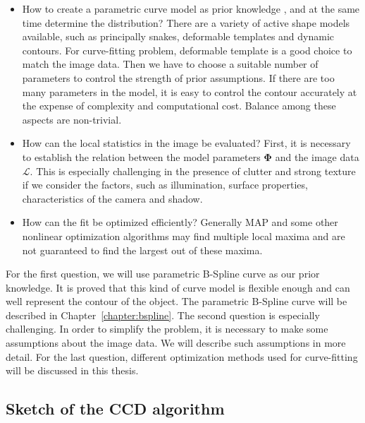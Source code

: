 \begin{itemize}
\item How to create a parametric curve model as prior knowledge , and
  at the same time determine the distribution? There are a variety of
  active shape models available, such as principally snakes,
  deformable templates and dynamic contours. For curve-fitting
  problem, deformable template is a good choice to match the image
  data. Then we have to choose a suitable number of parameters to control
  the strength of prior assumptions. If there are too many parameters
  in the model, it is easy to control the contour accurately at the
  expense of complexity and computational cost. Balance among these
  aspects are non-trivial.

\item How can the local statistics in the image be evaluated? First, it
  is necessary to establish the relation between the model parameters
  $\mathbf{\Phi}$ and the image data $\mathcal{L}$. This is especially
challenging in the presence of clutter and strong texture if we
consider the factors, such as  illumination, surface properties,
characteristics of the camera and shadow. 

\item How can the fit be optimized efficiently? Generally MAP and some
  other nonlinear optimization algorithms may find multiple local
  maxima and are not guaranteed to find the largest out of these maxima.
\end{itemize}


For the first question, we will use parametric B-Spline curve as
our prior knowledge. It is proved that this kind of curve model is
flexible enough and can well represent the contour of the object. The
parametric B-Spline curve will be described in Chapter~\ref{chapter:bspline}.
The second question is especially challenging. In order to simplify
the problem, it is necessary to make some assumptions about the image
data. We will describe such assumptions in more detail. For the last
question, different optimization methods used for curve-fitting will
be discussed in this thesis.

\subsection{Sketch of the CCD algorithm}
\label{sec:sccd}

